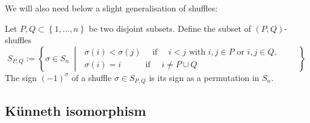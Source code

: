 \documentclass[12pt,a4paper,reqno]{amsart}
\begin{document}
We will also need below a slight generalisation of shuffles:
\begin{defn}
	Let $P,Q \subset \left\{ 1,\dots,n \right\}$ be two disjoint subsets. 
	Define the subset of $(P,Q)$-shuffles
	\begin{equation}
		S_{P,Q} := \left\{ \sigma \in S_{n} \;\middle|\;
		\begin{matrix}
			\sigma(i) < \sigma(j) \quad \text{ if } \quad 
			i < j \text{ with } i,j \in P \text{ or } i,j \in Q, \quad \quad \\
			\sigma(i) = i \quad \quad \;\; \text{ if } \quad i \neq P \cup Q
			\quad \quad\quad \quad\quad \quad\quad \quad\quad  \quad \quad
		\end{matrix}
		\right\}
	\end{equation}
	The sign $(-1)^{\sigma}$ of a shuffle $\sigma \in S_{P,Q}$ is its sign
	as a permutation in $S_n$. 
\end{defn}


\subsection{K{\"u}nneth isomorphism}
\label{subsection-kunneth-isomorphism}
\end{document}
